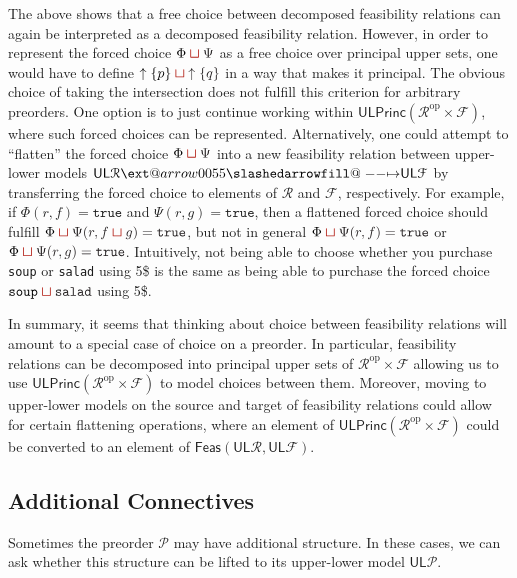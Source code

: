 \documentclass[12pt]{article}
\makeatletter
\theoremstyle{definition}
\theoremstyle{plain}
\theoremstyle{plain}
\theoremstyle{plain}
\theoremstyle{plain}
\theoremstyle{remark}
\theoremstyle{remark}
\newcommand{\mc}[1]{\mathcal{#1}}
\newcommand{\low}{\mathsf{L}}
\newcommand{\upper}{\mathsf{U}}
\newcommand{\true}{\mathtt{true}}
\newcommand{\upc}[1]{{\uparrow #1}}
\def\slashedarrowfill@#1#2#3#4#5{%
	$\m@th\thickmuskip0mu\medmuskip\thickmuskip\thinmuskip\thickmuskip
	\relax#5#1\mkern-7mu%
	\cleaders\hbox{$#5\mkern-2mu#2\mkern-2mu$}\hfill
	\mathclap{#3}\mathclap{#2}%
	\cleaders\hbox{$#5\mkern-2mu#2\mkern-2mu$}\hfill
	\mkern-7mu#4$%
}
\def\rightslashedarrowfill@{%
	\slashedarrowfill@\relbar\relbar\mapstochar\rightarrow}
\newcommand\xslashedrightarrow[2][]{%
	\ext@arrow 0055{\rightslashedarrowfill@}{#1}{#2}}
\newcommand{\csqcup}{\color{BrickRed}\bm{\sqcup}\color{Black}}
\makeatother
\begin{document}
The above shows that a free choice between decomposed feasibility relations can again be interpreted as a decomposed feasibility relation. However, in order to represent the forced choice $\Phi \csqcup \Psi$ as a free choice over principal upper sets, one would have to define $\upc\{p\} \csqcup \upc\{q\}$ in a way that makes it principal. The obvious choice of taking the intersection does not fulfill this criterion for arbitrary preorders. One option is to just continue working within $\upper\low\mathsf{Princ}(\mc{R}^\text{op} \times \mc{F})$, where such forced choices can be represented. Alternatively, one could attempt to ``flatten'' the forced choice $\Phi \csqcup \Psi$ into a new feasibility relation between upper-lower models $\upper\low\mc{R} \xslashedrightarrow{} \upper\low\mc{F}$ by transferring the forced choice to elements of $\mc{R}$ and $\mc{F}$, respectively. For example, if $\Phi(r,f)=\true$ and $\Psi(r,g) = \true$, then a flattened forced choice should fulfill $\Phi \csqcup \Psi(r,f \csqcup g) = \true$, but not in general $\Phi \csqcup \Psi(r,f) = \true$  or $\Phi \csqcup \Psi(r,g) = \true$. Intuitively, not being able to choose whether you purchase \texttt{soup} or \texttt{salad} using 5\$ is the same as being able to purchase the forced choice $\mathtt{soup} \csqcup \mathtt{salad}$ using 5\$.

In summary, it seems that thinking about choice between feasibility relations will amount to a special case of choice on a preorder. In particular, feasibility relations can be decomposed into principal upper sets of $\mc{R}^\text{op} \times \mc{F}$ allowing us to use $\upper\low\mathsf{Princ}(\mc{R}^\text{op} \times \mc{F})$ to model choices between them. Moreover, moving to upper-lower models on the source and target of feasibility relations could allow for certain flattening operations, where an element of $\upper\low\mathsf{Princ}(\mc{R}^\text{op} \times \mc{F})$ could be converted to an element of $\mathsf{Feas}(\upper\low\mc{R}, \upper\low\mc{F})$.

\subsection{Additional Connectives}
Sometimes the preorder $\mc{P}$ may have additional structure. In these cases, we can ask whether this structure can be lifted to its upper-lower model $\upper\low\mc{P}$. 
\end{document}
